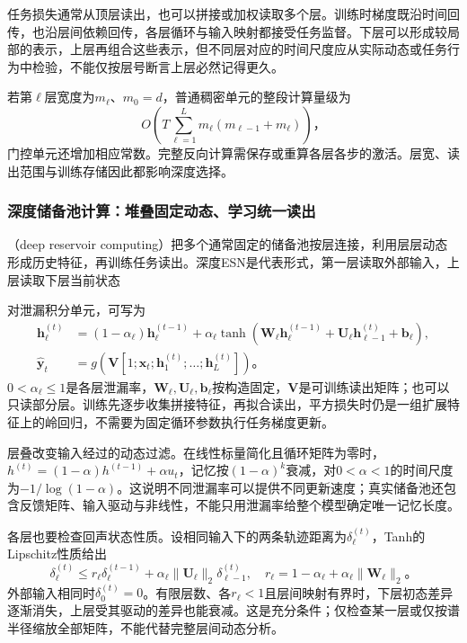 任务损失通常从顶层读出，也可以拼接或加权读取多个层。训练时梯度既沿时间回传，也沿层间依赖回传，各层循环与输入映射都接受任务监督。下层可以形成较局部的表示，上层再组合这些表示，但不同层对应的时间尺度应从实际动态或任务行为中检验，不能仅按层号断言上层必然记得更久。

若第$\ell$层宽度为$m_\ell$、$m_0=d$，普通稠密单元的整段计算量级为
\begin{equation}
  O\!\left(T\sum_{\ell=1}^{L}m_\ell(m_{\ell-1}+m_\ell)\right)\text{，}
  \label{eq:rnn-stacked-cost}
\end{equation}
门控单元还增加相应常数。完整反向计算需保存或重算各层各步的激活。层宽、读出范围与训练存储因此都影响深度选择。

\subsubsection{深度储备池计算：堆叠固定动态、学习统一读出}
\label{sec:rnn-deep-reservoir}

（deep reservoir computing）把多个通常固定的储备池按层连接，利用层层动态形成历史特征，再训练任务读出。深度ESN是代表形式，第一层读取外部输入，上层读取下层当前状态

对泄漏积分单元，可写为
\begin{equation}
  \begin{aligned}
    \bm h_\ell^{(t)}&=(1-\alpha_\ell)\bm h_\ell^{(t-1)}
      +\alpha_\ell\tanh\!\left(\bm W_\ell\bm h_\ell^{(t-1)}
               +\bm U_\ell\bm h_{\ell-1}^{(t)}+\bm b_\ell\right),\\
    \widehat{\bm y}_t&=g\!\left(\bm V
       [1;\bm x_t;\bm h_1^{(t)};\ldots;\bm h_L^{(t)}]\right)\text{。}
  \end{aligned}
  \label{eq:rnn-deep-esn}
\end{equation}
$0<\alpha_\ell\leq1$是各层泄漏率，$\bm W_\ell,\bm U_\ell,\bm b_\ell$按构造固定，$\bm V$是可训练读出矩阵；也可以只读部分层。训练先逐步收集拼接特征，再拟合读出，平方损失时仍是一组扩展特征上的岭回归，不需要为固定循环参数执行任务梯度更新。

层叠改变输入经过的动态过滤。在线性标量简化且循环矩阵为零时，$h^{(t)}=(1-\alpha)h^{(t-1)}+\alpha u_t$，记忆按$(1-\alpha)^k$衰减，对$0<\alpha<1$的时间尺度为$-1/\log(1-\alpha)$。这说明不同泄漏率可以提供不同更新速度；真实储备池还包含反馈矩阵、输入驱动与非线性，不能只用泄漏率给整个模型确定唯一记忆长度。

各层也要检查回声状态性质。设相同输入下的两条轨迹距离为$\delta_\ell^{(t)}$，Tanh的Lipschitz性质给出
\begin{equation}
  \delta_\ell^{(t)}\leq r_\ell\delta_\ell^{(t-1)}
       +\alpha_\ell\lVert\bm U_\ell\rVert_2\delta_{\ell-1}^{(t)},
  \quad r_\ell=1-\alpha_\ell+\alpha_\ell\lVert\bm W_\ell\rVert_2\text{。}
  \label{eq:rnn-deep-esn-contraction}
\end{equation}
外部输入相同时$\delta_0^{(t)}=0$。有限层数、各$r_\ell<1$且层间映射有界时，下层初态差异逐渐消失，上层受其驱动的差异也能衰减。这是充分条件；仅检查某一层或仅按谱半径缩放全部矩阵，不能代替完整层间动态分析。

